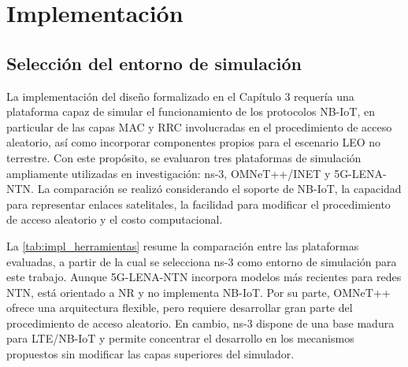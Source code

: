 \chapter{Implementación}
\label{ch:implementacion}

\section{Selección del entorno de simulación}
\label{sec:impl_herramientas}

La implementación del diseño formalizado en el Capítulo 3 requería una plataforma capaz de simular el funcionamiento de los protocolos NB-IoT, en particular de las capas MAC y RRC involucradas en el procedimiento de acceso aleatorio, así como incorporar componentes propios para el escenario LEO no terrestre. Con este propósito, se evaluaron tres plataformas de simulación ampliamente utilizadas en investigación: ns-3, OMNeT++/INET y 5G-LENA-NTN. La comparación se realizó considerando el soporte de NB-IoT, la capacidad para representar enlaces satelitales, la facilidad para modificar el procedimiento de acceso aleatorio y el costo computacional. 

La \cref{tab:impl_herramientas} resume la comparación entre las plataformas evaluadas, a partir de la cual se selecciona ns-3 como entorno de simulación para este trabajo. Aunque 5G-LENA-NTN incorpora modelos más recientes para redes NTN, está orientado a NR y no implementa NB-IoT. Por su parte, OMNeT++ ofrece una arquitectura flexible, pero requiere desarrollar gran parte del procedimiento de acceso aleatorio. En cambio, ns-3 dispone de una base madura para LTE/NB-IoT y permite concentrar el desarrollo en los mecanismos propuestos sin modificar las capas superiores del simulador.

